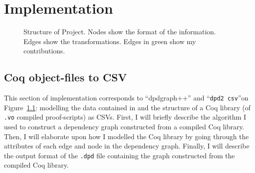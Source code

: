 \chapter{Implementation}\label{chap:impl}



\begin{figure}[t]
\centering

\caption{Structure of Project. Nodes show the format of the information. Edges
  show the transformations. Edges in green  show my contributions.}\label{fig:structure}
\end{figure}

\section{Coq object-files to CSV}

This section of implementation corresponds to ``dpdgraph++'' and ``\texttt{dpd2
csv}''on Figure~\ref{fig:structure}: modelling the data contained in and the
structure of a Coq library (of \texttt{.vo} compiled proof-scripts) as CSVs.
First, I will briefly describe the algorithm I used to construct a dependency
graph constructed from a compiled Coq library. Then, I will elaborate upon how I
modelled the Coq library by going through the attributes of each edge and node
in the dependency graph. Finally, I will describe the output format of the
\texttt{.dpd} file containing the graph constructed from the compiled Coq
library.

